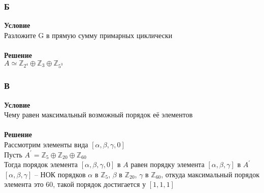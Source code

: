 		\subsubsection*{\textbf{Б}}
		\textbf{Условие}\\
		Разложите G в прямую сумму примарных циклически\\
		\\
		\textbf{Решение}\\
		$A \simeq \mathbb{Z}_{2^4} \oplus \mathbb{Z}_{3} \oplus \mathbb{Z}_{5^3}$\\
		
		\subsubsection*{\textbf{В}}
		\textbf{Условие}\\
		Чему равен максимальный возможный порядок её элементов\\
		\\
		\textbf{Решение}\\
		Рассмотрим элементы вида $[\alpha, \beta, \gamma, 0]$\\
		Пусть $A^{\prime} = \mathbb{Z}_5 \oplus \mathbb{Z}_20 \oplus \mathbb{Z}_60$\\
		Тогда порядок элемента $[\alpha, \beta, \gamma, 0]$ в $A$ равен порядку элемента $[\alpha, \beta, \gamma]$ в $A^{\prime}$\\
		$[\alpha, \beta, \gamma]$ -- НОК порядков $\alpha$ в $\mathbb{Z}_{5}$, $\beta$ в $\mathbb{Z}_{20}$, $\gamma$ в $\mathbb{Z}_{60}$, откуда максимальный порядок элемента это 60, такой порядок достигается у $[1,1,1]$\\
		
